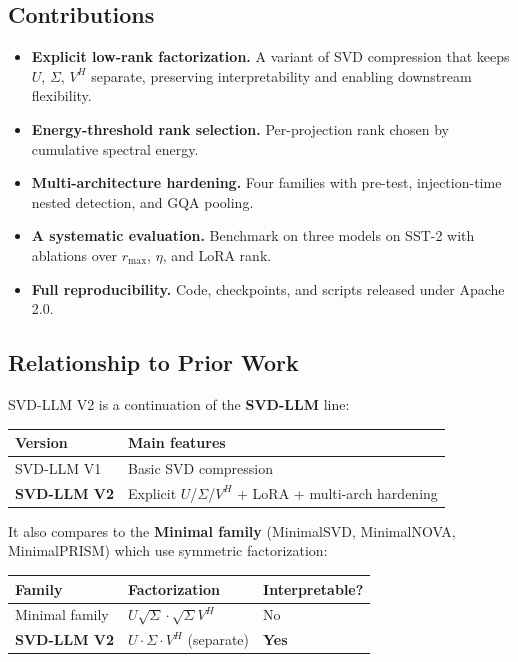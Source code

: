 \subsection{Contributions}

\begin{itemize}
\item \textbf{Explicit low-rank factorization.} A variant of SVD compression that
  keeps $U$, $\Sigma$, $V^H$ separate, preserving interpretability and
  enabling downstream flexibility.
\item \textbf{Energy-threshold rank selection.} Per-projection rank chosen by
  cumulative spectral energy.
\item \textbf{Multi-architecture hardening.} Four families with pre-test, injection-time
  nested detection, and GQA pooling.
\item \textbf{A systematic evaluation.} Benchmark on three models on SST-2 with
  ablations over $r_\text{max}$, $\eta$, and LoRA rank.
\item \textbf{Full reproducibility.} Code, checkpoints, and scripts released under
  Apache 2.0.

\end{itemize}
\subsection{Relationship to Prior Work}

SVD-LLM V2 is a continuation of the \textbf{SVD-LLM} line:

\begin{table}[H]
\centering
\small
\begin{tabular}{ll}
\toprule
\textbf{Version} & \textbf{Main features} \\
\midrule
SVD-LLM V1 & Basic SVD compression \\
\textbf{SVD-LLM V2} & Explicit $U$/$\Sigma$/$V^H$ + LoRA + multi-arch hardening \\
\bottomrule
\end{tabular}
\end{table}

It also compares to the \textbf{Minimal family} (MinimalSVD, MinimalNOVA, 
MinimalPRISM) which use symmetric factorization:

\begin{table}[H]
\centering
\small
\begin{tabular}{lll}
\toprule
\textbf{Family} & \textbf{Factorization} & \textbf{Interpretable?} \\
\midrule
Minimal family & $U\sqrt{\Sigma} \cdot \sqrt{\Sigma} V^H$ & No \\
\textbf{SVD-LLM V2} & $U \cdot \Sigma \cdot V^H$ (separate) & \textbf{Yes} \\
\bottomrule
\end{tabular}
\end{table}

